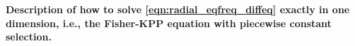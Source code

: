 \documentclass[10pt,letterpaper]{article}
\begin{document}
\textbf{
Description of how to solve \eqref{eqn:radial_eqfreq_diffeq} exactly in one dimension,
i.e., the Fisher-KPP equation with piecewise constant selection.
}
\end{document}
